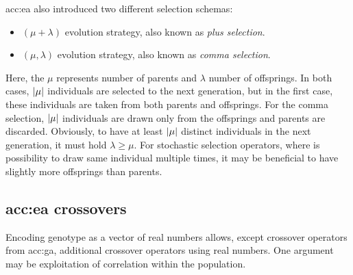 \acrshort{acc:ea} also introduced two different selection schemas:
\begin{itemize}
    \item $\left(\mu+\lambda\right)$ evolution strategy, also known as \emph{plus selection}.
    \item  $\left(\mu,\lambda\right)$ evolution strategy, also known as \emph{comma selection}.
\end{itemize}
Here, the $\mu$ represents number of parents and $\lambda$ number of offsprings. In both cases, $\left|{\mu}\right|$ individuals are selected to the next generation, but in the first case, these individuals are taken from both parents and offsprings. For the comma selection, $\left|{\mu}\right|$ individuals are drawn only from the offsprings and parents are discarded. Obviously, to have at least $\left|{\mu}\right|$ distinct individuals in the next generation, it must hold $\lambda\geq\mu$. For stochastic selection operators, where is possibility to draw same individual multiple times, it may be beneficial to have slightly more offsprings than parents.

\subsection{\texorpdfstring{\acrshort*{acc:ea} crossovers}{}}

Encoding genotype as a vector of real numbers allows, except crossover operators from \acrshort{acc:ga}, additional crossover operators using real numbers. One argument may be exploitation of correlation within the population.

